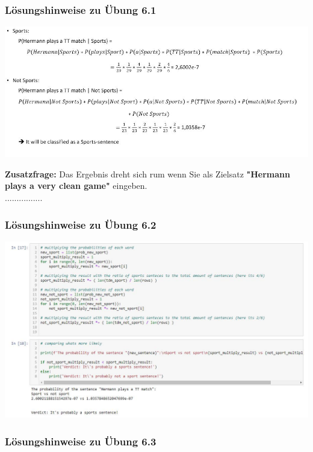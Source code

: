 \documentclass[12pt]{article}
\begin{document}
\subsubsection{Lösungshinweise zu Übung 6.1}

\begin{center} 
\includegraphics[width=1.1\textwidth]{Naive-Bayes-Ueb61_Hinweis}
\end{center}
\textbf{Zusatzfrage:} Das Ergebnis dreht sich rum wenn Sie als Zielsatz \textbf{"Hermann plays a very clean game"} eingeben.\\................

\subsubsection{Lösungshinweise zu Übung 6.2}

\begin{center} 
\includegraphics[width=1.1\textwidth]{Naive-Bayes-Ueb62_Hinweis}
\end{center}

\subsubsection{Lösungshinweise zu Übung 6.3}
\end{document}
